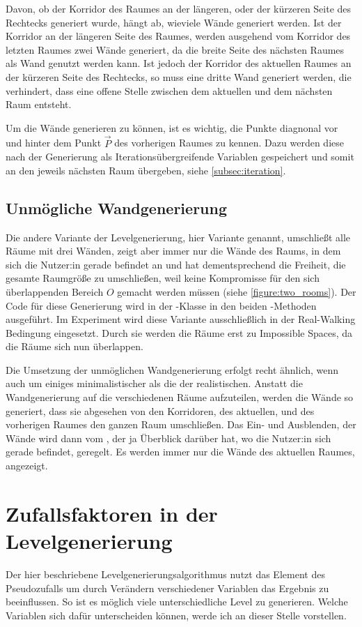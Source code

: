 Davon, ob der Korridor des Raumes an der längeren, oder der kürzeren Seite des Rechtecks generiert wurde, hängt ab, wieviele Wände generiert werden. Ist der Korridor an der längeren Seite des Raumes, werden ausgehend vom Korridor des letzten Raumes zwei Wände generiert, da die breite Seite des nächsten Raumes als Wand genutzt werden kann. Ist jedoch der Korridor des aktuellen Raumes an der kürzeren Seite des Rechtecks, so muss eine dritte Wand generiert werden, die verhindert, dass eine offene Stelle zwischen dem aktuellen und dem nächsten Raum entsteht.

Um die Wände generieren zu können, ist es wichtig, die Punkte diagnonal vor und hinter dem Punkt $\vec{P}$ des vorherigen Raumes zu kennen. Dazu werden diese nach der Generierung als Iterationsübergreifende Variablen gespeichert und somit an den jeweils nächsten Raum übergeben, siehe \autoref{subsec:iteration}.

\subsection{Unmögliche Wandgenerierung}
Die andere Variante der Levelgenerierung, hier  Variante genannt, umschließt alle Räume mit drei Wänden, zeigt aber immer nur die Wände des Raums, in dem sich die Nutzer:in gerade befindet an und hat dementsprechend die Freiheit, die gesamte Raumgröße zu umschließen, weil keine Kompromisse für den sich überlappenden Bereich $O$ gemacht werden müssen (siehe \autoref{figure:two_rooms}). Der Code für diese Generierung wird in der -Klasse in den beiden -Methoden ausgeführt. Im Experiment wird diese Variante ausschließlich in der Real-Walking Bedingung eingesetzt. Durch sie werden die Räume erst zu Impossible Spaces, da die Räume sich nun überlappen.

Die Umsetzung der unmöglichen Wandgenerierung erfolgt recht ähnlich, wenn auch um einiges minimalistischer als die der realistischen. Anstatt die Wandgenerierung auf die verschiedenen Räume aufzuteilen, werden die Wände so generiert, dass sie abgesehen von den Korridoren, des aktuellen, und des vorherigen Raumes den ganzen Raum umschließen. Das Ein- und Ausblenden, der Wände wird dann vom , der ja Überblick darüber hat, wo die Nutzer:in sich gerade befindet, geregelt. Es werden immer nur die Wände des aktuellen Raumes, angezeigt.

\section{Zufallsfaktoren in der Levelgenerierung}
\label{sec:random}
Der hier beschriebene Levelgenerierungsalgorithmus nutzt das Element des Pseudozufalls um durch Verändern verschiedener Variablen das Ergebnis zu beeinflussen. So ist es möglich viele unterschiedliche Level zu generieren. Welche Variablen sich dafür unterscheiden können, werde ich an dieser Stelle vorstellen.

